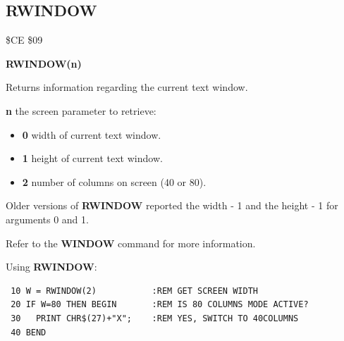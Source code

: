 \subsection{RWINDOW}
\begin{description}[leftmargin=2cm,style=nextline]
\item [Token:] \$CE \$09
\item [Format:] {\bf RWINDOW(n)}
\item [Usage:]  Returns information regarding the current text window.

                {\bf n} the screen parameter to retrieve:

                \begin{itemize}
                    \item {\bf 0} width of current text window.
                    \item {\bf 1} height of current text window.
                    \item {\bf 2} number of columns on screen (40 or 80).
                \end{itemize}

\item [Remarks:] Older versions of {\bf RWINDOW} reported
                 the width - 1 and the height - 1 for arguments 0 and 1.

                 Refer to the {\bf WINDOW} command for more information.

\item [Example:] Using {\bf RWINDOW}:
\begin{tcolorbox}[colback=black,coltext=white]
\verbatimfont{\codefont}
\begin{verbatim}
 10 W = RWINDOW(2)           :REM GET SCREEN WIDTH
 20 IF W=80 THEN BEGIN       :REM IS 80 COLUMNS MODE ACTIVE?
 30   PRINT CHR$(27)+"X";    :REM YES, SWITCH TO 40COLUMNS
 40 BEND
\end{verbatim}
\end{tcolorbox}
\end{description}





\newpage
